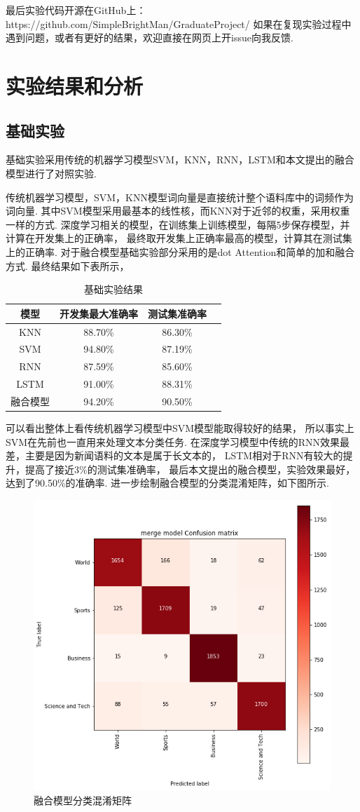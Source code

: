 \documentclass[bachelor,winfonts]{jnuthesis}
\begin{document}
最后实验代码开源在GitHub上：https://github.com/SimpleBrightMan/GraduateProject/
如果在复现实验过程中遇到问题，或者有更好的结果，欢迎直接在网页上开issue向我反馈.

\section{实验结果和分析}
\subsection{基础实验}
基础实验采用传统的机器学习模型SVM，KNN，RNN，LSTM和本文提出的融合模型进行了对照实验.

传统机器学习模型，SVM，KNN模型词向量是直接统计整个语料库中的词频作为词向量.
其中SVM模型采用最基本的线性核，而KNN对于近邻的权重，采用权重一样的方式.
深度学习相关的模型，在训练集上训练模型，每隔5步保存模型，并计算在开发集上的正确率，
最终取开发集上正确率最高的模型，计算其在测试集上的正确率.
对于融合模型基础实验部分采用的是dot Attention和简单的加和融合方式.
最终结果如下表所示，

\begin{table}[h!]
  \centering
  \begin{tabular}{cccc}
    \toprule
    \textbf{模型} & \textbf{开发集最大准确率} & \textbf{测试集准确率} \\
    \midrule
    KNN & 88.70\% & 86.30\% \\
    SVM & 94.80\% & 87.19\% \\
    RNN & 87.59\% & 85.60\% \\
    LSTM & 91.00\% & 88.31\% \\
    融合模型 & 94.20\% & 90.50\% \\
    \bottomrule
  \end{tabular}
  \caption{基础实验结果}
\end{table}


可以看出整体上看传统机器学习模型中SVM模型能取得较好的结果，
所以事实上SVM在先前也一直用来处理文本分类任务.
在深度学习模型中传统的RNN效果最差，主要是因为新闻语料的文本是属于长文本的，
LSTM相对于RNN有较大的提升，提高了接近3\%的测试集准确率，
最后本文提出的融合模型，实验效果最好，达到了90.50\%的准确率.
进一步绘制融合模型的分类混淆矩阵，如下图所示.

\begin{figure}[h!]
  \centering
  \includegraphics[width=0.45\linewidth]{混淆矩阵.png}
  \caption{融合模型分类混淆矩阵}
\end{figure}
\end{document}
